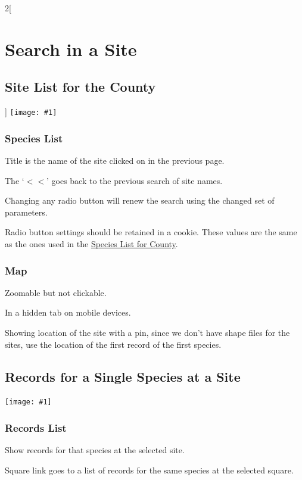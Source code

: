 \documentclass[a4paper,12pt,landscape]{article}
\newcommand{\wireframe}[1]{\texttt{[image: \#1]}\clearpage}
\begin{document}
\begin{multicols*}{2}[%
  \section{Search in a Site}%
  \subsection{Site List for the County}%
]
\wireframe{./wireframes/Species__ListForSite.png}%

\subsubsection*{Species List} 

\begin{todolist}
  \item Title is the name of the site clicked on in the previous page.
  \item The `$<<$' goes back to the previous search of site names.
  \item Changing any radio button will renew the search using the changed set of parameters.
  \item Radio button settings should be retained in a cookie.
    These values are the same as the ones used in the \hyperref[sec:species-list-for-county]{Species List for County}.

\end{todolist}

\subsubsection*{Map}

\begin{todolist}
  \item Zoomable but not clickable.
  \item In a hidden tab on mobile devices.
  \item Showing location of the site with a pin, since we don't have shape files for the sites,
   use the location of the first record of the first species.
\end{todolist}

\clearpage

\subsection{Records for a Single Species at a Site}

\wireframe{./wireframes/Records__SingleSpeciesForSite.png}%

\subsubsection*{Records List} 

\begin{todolist}
  \item Show records for that species at the selected site.
  \item Square link goes to a list of records for the same species at the selected square.
\end{todolist}


\end{multicols*}
\end{document}
